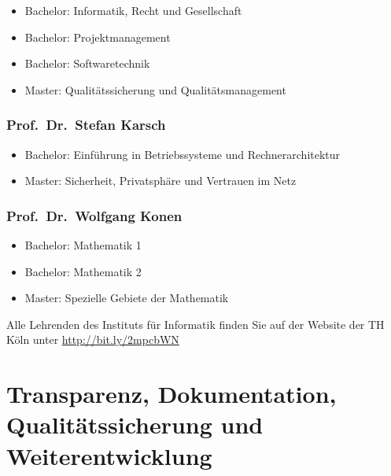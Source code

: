 \begin{itemize}
\tightlist
\item
  Bachelor: Informatik, Recht und Gesellschaft
\item
  Bachelor: Projektmanagement
\item
  Bachelor: Softwaretechnik
\item
  Master: Qualitätssicherung und Qualitätsmanagement
\end{itemize}

\subsection{Prof.~Dr.~Stefan
Karsch\label{/mi-2017/selbstbericht/0800-ausstattung/0000-ausstattung}}\label{prof.dr.stefan-karschpathlabelmi-2017selbstbericht0800-ausstattung0000-ausstattung}

\begin{itemize}
\tightlist
\item
  Bachelor: Einführung in Betriebssysteme und Rechnerarchitektur
\item
  Master: Sicherheit, Privatsphäre und Vertrauen im Netz
\end{itemize}

\subsection{Prof.~Dr.~Wolfgang
Konen\label{/mi-2017/selbstbericht/0800-ausstattung/0000-ausstattung}}\label{prof.dr.wolfgang-konenpathlabelmi-2017selbstbericht0800-ausstattung0000-ausstattung}

\begin{itemize}
\tightlist
\item
  Bachelor: Mathematik 1
\item
  Bachelor: Mathematik 2
\item
  Master: Spezielle Gebiete der Mathematik
\end{itemize}

Alle Lehrenden des Instituts für Informatik finden Sie auf der Website
der TH Köln unter \href{http://bit.ly/2mbFEYc}{http://bit.ly/2mpcbWN}

\chapter{Transparenz, Dokumentation, Qualitätssicherung und
Weiterentwicklung\label{/mi-2017/selbstbericht/0900-transparenz-und-dokumentation/0000-transparenz-und-dokumentation}}\label{transparenz-dokumentation-qualituxe4tssicherung-und-weiterentwicklungpathlabelmi-2017selbstbericht0900-transparenz-und-dokumentation0000-transparenz-und-dokumentation}

